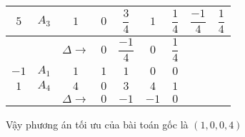 \documentclass{article}
\begin{document}
\begin{enumerate}
\begin{center}
\begin{tabular}{|c|c|c|c|c|c|c|c|c|}
              \hline
              $5$&$A_3$&$1$&$0$&$\dfrac{3}{4}$&$1$&$\dfrac{1}{4}$&$\dfrac{-1}{4}$&$\dfrac{1}{4}$\\
              \hline
              &&$\Delta\rightarrow$&$0$&$\dfrac{-1}{4}$&$0$&$\dfrac{1}{4}$&&\\
              \hline
              $-1$&$A_1$&$1$&$1$&$1$&$0$&$0$&&\\
              \hline
              $1$&$A_4$&$4$&$0$&$3$&$4$&$1$&&\\
              \hline
              &&$\Delta\rightarrow$&$0$&$-1$&$-1$&$0$&&  \\
             
              \hline 
                \end{tabular}
            \end{center}
            Vậy phương án tối ưu của bài toán gốc là $(1,0,0,4)$\\



                \end{enumerate}
\end{document}
